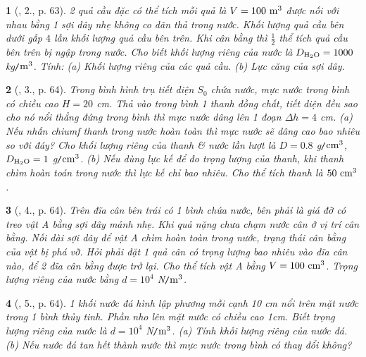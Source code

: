 \documentclass{article}
\newtheorem{baitoan}{}
\begin{document}
\begin{baitoan}[\cite{Van_Quyen_Hanh_Nhu_10_chuyen_Ly}, 2., p. 63]
	2 quả cầu đặc có thể tích mỗi quả là $V = 100\ {\rm m}^3$ được nối với nhau bằng 1 sợi dây nhẹ không co dãn thả trong nước. Khối lượng quả cầu bên dưới gấp $4$ lần khối lượng quả cầu bên trên. Khi cân bằng thì $\frac{1}{2}$ thể tích quả cầu bên trên bị ngập trong nước. Cho biết khối lượng riêng của nước là $D_{\rm H_2O} = 1000$ {\rm kg{\tt/}$\rm m^3$}. Tính: (a) Khối lượng riêng của các quả cầu. (b) Lực căng của sợi dây.
\end{baitoan}

\begin{baitoan}[\cite{Van_Quyen_Hanh_Nhu_10_chuyen_Ly}, 3., p. 64]
	Trong bình hình trụ tiết diện $S_0$ chứa nước, mực nước trong bình có chiều cao $H = 20$ {\rm cm}. Thả vào trong bình 1 thanh đồng chất, tiết diện đều sao cho nó nổi thẳng đứng trong bình thì mực nước dâng lên 1 đoạn $\Delta h = 4$ {\rm cm}. (a) Nếu nhấn chiumf thanh trong nước hoàn toàn thì mực nước sẽ dâng cao bao nhiêu so với đáy? Cho khối lượng riêng của thanh \& nước lần lượt là $D = 0.8$ {\rm g{\tt/}$\rm cm^3$}, $D_{\rm H_2O} = 1$ {\rm g{\tt/}$\rm cm^3$}. (b) Nếu dùng lực kế để đo trọng lượng của thanh, khi thanh chìm hoàn toán trong nước thì lực kế chỉ bao nhiêu. Cho thể tích thanh là $50\ {\rm cm}^3$.
\end{baitoan}

\begin{baitoan}[\cite{Van_Quyen_Hanh_Nhu_10_chuyen_Ly}, 4., p. 64]
	Trên đĩa cân bên trái có 1 bình chứa nước, bên phải là giá đỡ có treo vật A bằng sợi dây mảnh nhẹ. Khi quả nặng chưa chạm nước cân ở vị trí cân bằng. Nối dài sợi dây để vật A chìm hoàn toàn trong nước, trạng thái cân bằng của vật bị phá vỡ. Hỏi phải đặt 1 quả cân có trọng lượng bao nhiêu vào đĩa cân nào, để 2 đĩa cân bằng được trở lại. Cho thể tích vật A bằng $V = 100\ {\rm cm}^3$. Trọng lượng riêng của nước bằng $d = 10^4$ {\rm N{\tt/}$\rm m^3$}.
\end{baitoan}

\begin{baitoan}[\cite{Van_Quyen_Hanh_Nhu_10_chuyen_Ly}, 5., p. 64]
	1 khối nước đá hình lập phương mỗi cạnh {\rm10 cm} nổi trên mặt nước trong 1 bình thủy tinh. Phần nho lên mặt nước có chiều cao {\rm 1cm}. Biết trọng lượng riêng của nước là $d = 10^4$ {\rm N{\tt/}$\rm m^3$}. (a) Tính khối lượng riêng của nước đá. (b) Nếu nước đá tan hết thành nước thì mực nước trong bình có thay đổi không?
\end{baitoan}
\end{document}
